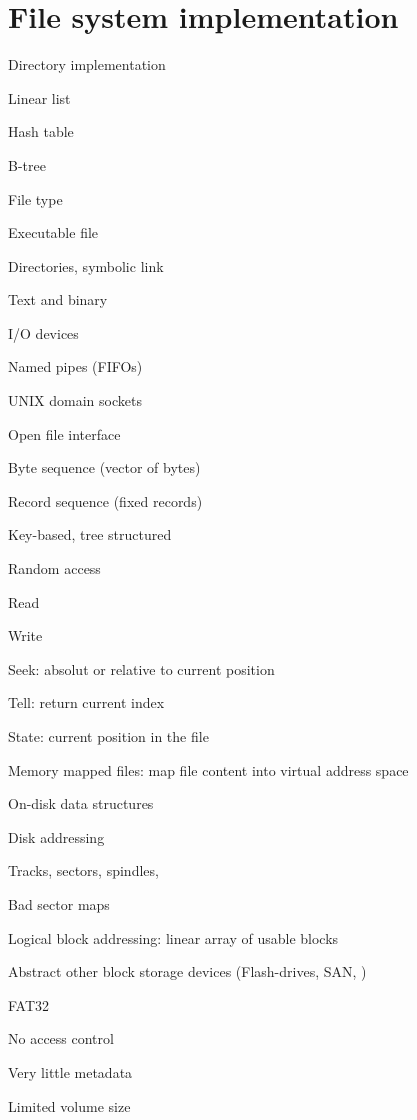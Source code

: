 \section{File system implementation}
\enumstart
	\item Directory implementation
	\enumstart
		\item Linear list
		\item Hash table
		\item B-tree
	\enumend
	\item File type
	\enumstart
		\item Executable file
		\item Directories, symbolic link
		\item Text and binary
		\item I/O devices
		\item Named pipes (FIFOs)
		\item UNIX domain sockets
	\enumend
	\item Open file interface
	\enumstart
		\item Byte sequence (vector of bytes)
		\item Record sequence (fixed records)
		\item Key-based, tree structured
	\enumend
	\item Random access
	\enumstart
		\item Read
		\item Write
		\item Seek: absolut or relative to current position
		\item Tell: return current index
		\item State: current position in the file
	\enumend
	\item Memory mapped files: map file content into virtual address space
	\item On-disk data structures
	\enumstart
		\item Disk addressing
		\enumstart
			\item Tracks, sectors, spindles, \ddd
			\item Bad sector maps
			\item Logical block addressing: linear array of usable blocks
			\item Abstract other block storage devices (Flash-drives, SAN, \ddd)
		\enumend
	\enumend
	\item FAT32
	\enumstart
		\item No access control
		\item Very little metadata
		\item Limited volume size

